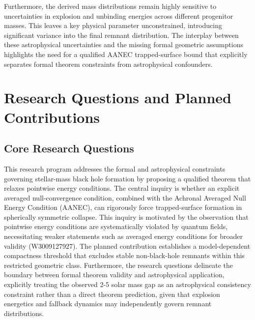 \documentclass[conference]{IEEEtran}
\begin{document}
Furthermore, the derived mass distributions remain highly sensitive to uncertainties in explosion and unbinding energies across different progenitor masses. This leaves a key physical parameter unconstrained, introducing significant variance into the final remnant distribution. The interplay between these astrophysical uncertainties and the missing formal geometric assumptions highlights the need for a qualified AANEC trapped-surface bound that explicitly separates formal theorem constraints from astrophysical confounders.

\section{Research Questions and Planned Contributions}
\subsection{Core Research Questions}
This research program addresses the formal and astrophysical constraints governing stellar-mass black hole formation by proposing a qualified theorem that relaxes pointwise energy conditions. The central inquiry is whether an explicit averaged null-convergence condition, combined with the Achronal Averaged Null Energy Condition (AANEC), can rigorously force trapped-surface formation in spherically symmetric collapse. This inquiry is motivated by the observation that pointwise energy conditions are systematically violated by quantum fields, necessitating weaker statements such as averaged energy conditions for broader validity (W3009127927). The planned contribution establishes a model-dependent compactness threshold that excludes stable non-black-hole remnants within this restricted geometric class. Furthermore, the research questions delineate the boundary between formal theorem validity and astrophysical application, explicitly treating the observed 2-5 solar mass gap as an astrophysical consistency constraint rather than a direct theorem prediction, given that explosion energetics and fallback dynamics may independently govern remnant distributions.~\cite{cite_7a407c865faafd11}
\end{document}
